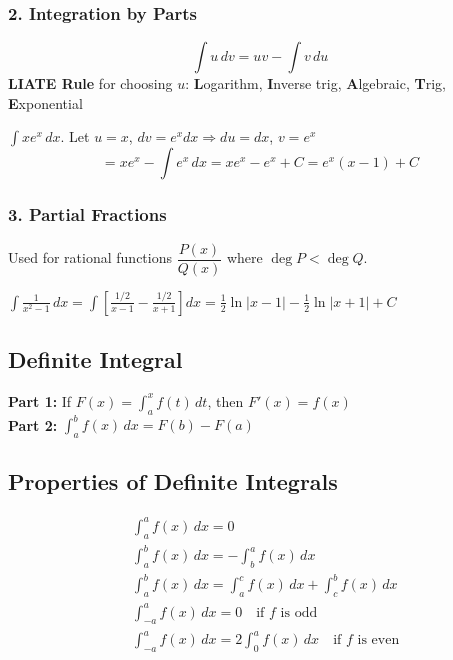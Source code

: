 \documentclass[12pt]{article}
\begin{document}
\subsubsection*{2. Integration by Parts}

\begin{formulabox}
\[
  \int u\,dv = uv - \int v\,du
\]
\textbf{LIATE Rule} for choosing $u$: \textbf{L}ogarithm, \textbf{I}nverse trig, \textbf{A}lgebraic, \textbf{T}rig, \textbf{E}xponential
\end{formulabox}

\begin{examplebox*}
$\displaystyle\int x e^x\,dx$. Let $u = x$, $dv = e^x dx \Rightarrow du = dx$, $v = e^x$
\[
  = xe^x - \int e^x\,dx = xe^x - e^x + C = e^x(x-1) + C
\]
\end{examplebox*}

\subsubsection*{3. Partial Fractions}

Used for rational functions $\dfrac{P(x)}{Q(x)}$ where $\deg P < \deg Q$.

\begin{examplebox*}
$\displaystyle\int \frac{1}{x^2-1}\,dx = \int\!\left[\frac{1/2}{x-1} - \frac{1/2}{x+1}\right]dx = \frac{1}{2}\ln|x-1| - \frac{1}{2}\ln|x+1| + C$
\end{examplebox*}

\subsection{Definite Integral}

\begin{thmbox}
\textbf{Part 1:} If $F(x) = \displaystyle\int_a^x f(t)\,dt$, then $F'(x) = f(x)$\\[8pt]
\textbf{Part 2:} $\displaystyle\int_a^b f(x)\,dx = F(b) - F(a)$
\end{thmbox}

\subsection{Properties of Definite Integrals}

\begin{formulabox}
\begin{align*}
  &\int_a^a f(x)\,dx = 0 \\[4pt]
  &\int_a^b f(x)\,dx = -\int_b^a f(x)\,dx \\[4pt]
  &\int_a^b f(x)\,dx = \int_a^c f(x)\,dx + \int_c^b f(x)\,dx \\[4pt]
  &\int_{-a}^a f(x)\,dx = 0 \quad \text{if } f \text{ is odd} \\[4pt]
  &\int_{-a}^a f(x)\,dx = 2\int_0^a f(x)\,dx \quad \text{if } f \text{ is even}
\end{align*}
\end{formulabox}
\end{document}
